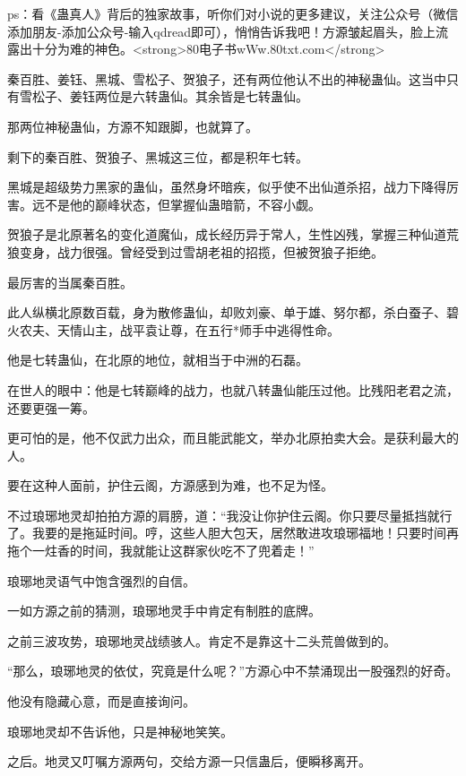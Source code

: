 
\begin{this_body}

ps：看《蛊真人》背后的独家故事，听你们对小说的更多建议，关注公众号（微信添加朋友-添加公众号-输入qdread即可），悄悄告诉我吧！方源皱起眉头，脸上流露出十分为难的神色。<strong>80电子书wWw.80txt.com</strong>

秦百胜、姜钰、黑城、雪松子、贺狼子，还有两位他认不出的神秘蛊仙。这当中只有雪松子、姜钰两位是六转蛊仙。其余皆是七转蛊仙。

那两位神秘蛊仙，方源不知跟脚，也就算了。

剩下的秦百胜、贺狼子、黑城这三位，都是积年七转。

黑城是超级势力黑家的蛊仙，虽然身坏暗疾，似乎使不出仙道杀招，战力下降得厉害。远不是他的巅峰状态，但掌握仙蛊暗箭，不容小觑。

贺狼子是北原著名的变化道魔仙，成长经历异于常人，生性凶残，掌握三种仙道荒狼变身，战力很强。曾经受到过雪胡老祖的招揽，但被贺狼子拒绝。

最厉害的当属秦百胜。

此人纵横北原数百载，身为散修蛊仙，却败刘豪、单于雄、努尔都，杀白蚕子、碧火农夫、天情山主，战平袁让尊，在五行*师手中逃得性命。

他是七转蛊仙，在北原的地位，就相当于中洲的石磊。

在世人的眼中：他是七转巅峰的战力，也就八转蛊仙能压过他。比残阳老君之流，还要更强一筹。

更可怕的是，他不仅武力出众，而且能武能文，举办北原拍卖大会。是获利最大的人。

要在这种人面前，护住云阁，方源感到为难，也不足为怪。

不过琅琊地灵却拍拍方源的肩膀，道：“我没让你护住云阁。你只要尽量抵挡就行了。我要的是拖延时间。哼，这些人胆大包天，居然敢进攻琅琊福地！只要时间再拖个一炷香的时间，我就能让这群家伙吃不了兜着走！”

琅琊地灵语气中饱含强烈的自信。

一如方源之前的猜测，琅琊地灵手中肯定有制胜的底牌。

之前三波攻势，琅琊地灵战绩骇人。肯定不是靠这十二头荒兽做到的。

“那么，琅琊地灵的依仗，究竟是什么呢？”方源心中不禁涌现出一股强烈的好奇。

他没有隐藏心意，而是直接询问。

琅琊地灵却不告诉他，只是神秘地笑笑。

之后。地灵又叮嘱方源两句，交给方源一只信蛊后，便瞬移离开。


\end{this_body}
